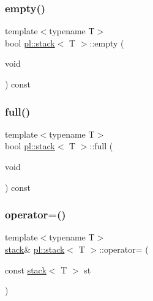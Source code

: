\mbox{\label{classpl_1_1stack_aca2e0457107fc5dedd3f70965f70cb91}} 
\subsubsection{\texorpdfstring{empty()}{empty()}}
{\footnotesize\ttfamily template$<$typename T$>$ \\
bool \hyperlink{classpl_1_1stack}{pl\+::stack}$<$ T $>$\+::empty (\begin{DoxyParamCaption}\item[{void}]{ }\end{DoxyParamCaption}) const\hspace{0.3cm}{\ttfamily [inline]}}

\mbox{\label{classpl_1_1stack_a079fc472e272b4ae05c9b9a360c919bc}} 
\subsubsection{\texorpdfstring{full()}{full()}}
{\footnotesize\ttfamily template$<$typename T$>$ \\
bool \hyperlink{classpl_1_1stack}{pl\+::stack}$<$ T $>$\+::full (\begin{DoxyParamCaption}\item[{void}]{ }\end{DoxyParamCaption}) const\hspace{0.3cm}{\ttfamily [inline]}}

\mbox{\label{classpl_1_1stack_a9b42f29bf5355bbf95868a16cbacb6a0}} 
\subsubsection{\texorpdfstring{operator=()}{operator=()}}
{\footnotesize\ttfamily template$<$typename T$>$ \\
\hyperlink{classpl_1_1stack}{stack}\& \hyperlink{classpl_1_1stack}{pl\+::stack}$<$ T $>$\+::operator= (\begin{DoxyParamCaption}\item[{const \hyperlink{classpl_1_1stack}{stack}$<$ T $>$}]{st }\end{DoxyParamCaption})\hspace{0.3cm}{\ttfamily [inline]}}

